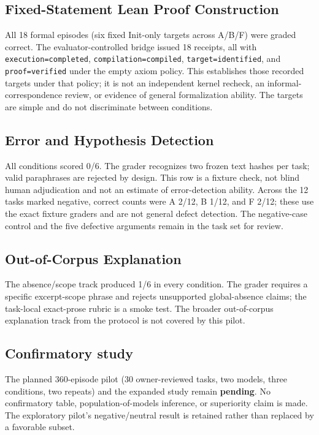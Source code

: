 \documentclass{article}
\begin{document}
\subsection{Fixed-Statement Lean Proof Construction}
All 18 formal episodes (six fixed Init-only targets across A/B/F) were graded
correct. The evaluator-controlled bridge issued 18 receipts, all with
\texttt{execution=completed}, \texttt{compilation=compiled},
\texttt{target=identified}, and \texttt{proof=verified} under the empty axiom
policy. This establishes those recorded targets under that policy; it is not an
independent kernel recheck, an informal-correspondence review, or evidence of
general formalization ability. The targets are simple and do not discriminate
between conditions.

\subsection{Error and Hypothesis Detection}
All conditions scored 0/6. The grader recognizes two frozen text hashes per
task; valid paraphrases are rejected by design. This row is a fixture check,
not blind human adjudication and not an estimate of error-detection ability.
Across the 12 tasks marked negative, correct counts were A 2/12, B 1/12, and
F 2/12; these use the exact fixture graders and are not general defect
detection. The negative-case control and the five defective arguments remain
in the task set for review.

\subsection{Out-of-Corpus Explanation}
The absence/scope track produced 1/6 in every condition. The grader requires a
specific excerpt-scope phrase and rejects unsupported global-absence claims;
the task-local exact-prose rubric is a smoke test. The broader out-of-corpus
explanation track from the protocol is not covered by this pilot.

\subsection{Confirmatory study}
The planned 360-episode pilot (30 owner-reviewed tasks, two models, three
conditions, two repeats) and the expanded study remain \textbf{pending}. No
confirmatory table, population-of-models inference, or superiority claim is
made. The exploratory pilot's negative/neutral result is retained rather than
replaced by a favorable subset.
\end{document}
